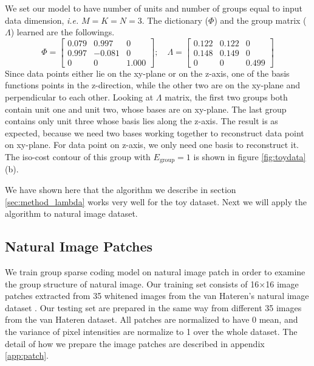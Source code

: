 We set our model to have number of units and number of groups equal to input data dimension, \textit{i.e.} $M = K = N = 3$. The dictionary ($\Phi$) and the group matrix ($\Lambda$) learned are the followings.
\begin{equation}
\Phi = \begin{bmatrix}
	 0.079 & 0.997 & 0     \\
	 0.997 & -0.081 & 0     \\
	 0     & 0     & 1.000
\end{bmatrix}; \quad
\Lambda = \begin{bmatrix}
	0.122 & 0.122 & 0     \\
	0.148 & 0.149 & 0     \\
	0     & 0     & 0.499
\end{bmatrix}
\end{equation}
Since data points either lie on the xy-plane or on the z-axis, one of the basis functions points in the z-direction, while the other two are on the xy-plane and perpendicular to each other. Looking at $\Lambda$ matrix, the first two groups both contain unit one and unit two, whose bases are on xy-plane. The last group contains only unit three whose basis lies along the z-axis. The result is as expected, because we need two bases working together to reconstruct data point on xy-plane. For data point on z-axis, we only need one basis to reconstruct it. The iso-cost contour of this group with $E_{\text{group}} = 1$ is shown in figure \ref{fig:toydata}(b).

We have shown here that the algorithm we describe in section \ref{sec:method_lambda} works very well for the toy dataset. Next we will apply the algorithm to natural image dataset.

\subsection{Natural Image Patches}
\label{sec:img}

We train group sparse coding model on natural image patch in order to examine the group structure of natural image. Our training set consists of 16$\times$16 image patches extracted from 35 whitened images from the van Hateren's natural image dataset \cite{hj98}. Our testing set are prepared in the same way from different 35 images from the van Hateren dataset. All patches are normalized to have 0 mean, and the variance of pixel intensities are normalize to 1 over the whole dataset. The detail of how we prepare the image patches are described in appendix \ref{app:patch}.

